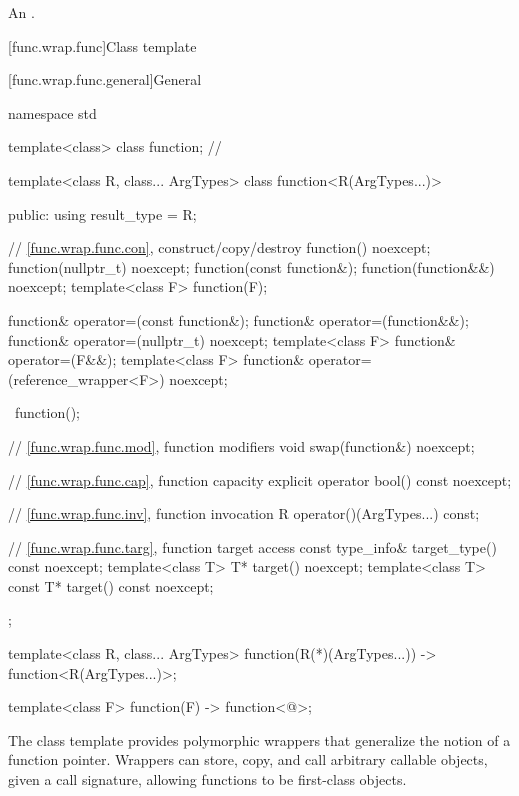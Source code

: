 \begin{itemdescr}
\pnum
\returns
An
 \ntbs{}.
\end{itemdescr}

[func.wrap.func]{Class template }

[func.wrap.func.general]{General}
%

%
\begin{codeblock}
namespace std {
  template<class> class function;       // \notdef

  template<class R, class... ArgTypes>
  class function<R(ArgTypes...)> {
  public:
    using result_type = R;

    // \ref{func.wrap.func.con}, construct/copy/destroy
    function() noexcept;
    function(nullptr_t) noexcept;
    function(const function&);
    function(function&&) noexcept;
    template<class F> function(F);

    function& operator=(const function&);
    function& operator=(function&&);
    function& operator=(nullptr_t) noexcept;
    template<class F> function& operator=(F&&);
    template<class F> function& operator=(reference_wrapper<F>) noexcept;

    ~function();

    // \ref{func.wrap.func.mod}, function modifiers
    void swap(function&) noexcept;

    // \ref{func.wrap.func.cap}, function capacity
    explicit operator bool() const noexcept;

    // \ref{func.wrap.func.inv}, function invocation
    R operator()(ArgTypes...) const;

    // \ref{func.wrap.func.targ}, function target access
    const type_info& target_type() const noexcept;
    template<class T>       T* target() noexcept;
    template<class T> const T* target() const noexcept;
  };

  template<class R, class... ArgTypes>
    function(R(*)(ArgTypes...)) -> function<R(ArgTypes...)>;

  template<class F> function(F) -> function<@\seebelow@>;
}
\end{codeblock}

\pnum
The  class template provides polymorphic wrappers that
generalize the notion of a function pointer. Wrappers can store, copy,
and call arbitrary callable objects, given a call
signature, allowing functions to be first-class objects.

